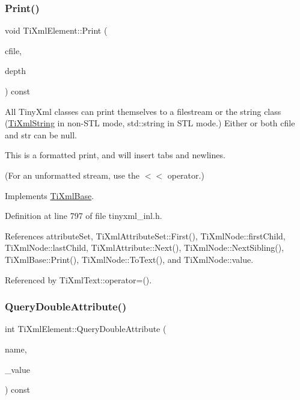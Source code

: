 \hypertarget{class_ti_xml_element_aa31a15cddfb8601a31236fe7d2569fb4}{}\label{class_ti_xml_element_aa31a15cddfb8601a31236fe7d2569fb4} 
\subsubsection{\texorpdfstring{Print()}{Print()}}
{\footnotesize\ttfamily void Ti\+Xml\+Element\+::\+Print (\begin{DoxyParamCaption}\item[{F\+I\+LE $\ast$}]{cfile,  }\item[{int}]{depth }\end{DoxyParamCaption}) const\hspace{0.3cm}{\ttfamily [virtual]}}

All Tiny\+Xml classes can print themselves to a filestream or the string class (\hyperlink{class_ti_xml_string}{Ti\+Xml\+String} in non-\/\+S\+TL mode, std\+::string in S\+TL mode.) Either or both cfile and str can be null.

This is a formatted print, and will insert tabs and newlines.

(For an unformatted stream, use the $<$$<$ operator.) 

Implements \hyperlink{class_ti_xml_base_a0de56b3f2ef14c65091a3b916437b512}{Ti\+Xml\+Base}.



Definition at line 797 of file tinyxml\+\_\+inl.\+h.



References attribute\+Set, Ti\+Xml\+Attribute\+Set\+::\+First(), Ti\+Xml\+Node\+::first\+Child, Ti\+Xml\+Node\+::last\+Child, Ti\+Xml\+Attribute\+::\+Next(), Ti\+Xml\+Node\+::\+Next\+Sibling(), Ti\+Xml\+Base\+::\+Print(), Ti\+Xml\+Node\+::\+To\+Text(), and Ti\+Xml\+Node\+::value.



Referenced by Ti\+Xml\+Text\+::operator=().

\hypertarget{class_ti_xml_element_ae04bad29ddb281a7e6c662b3882e9928}{}\label{class_ti_xml_element_ae04bad29ddb281a7e6c662b3882e9928} 
\subsubsection{\texorpdfstring{Query\+Double\+Attribute()}{QueryDoubleAttribute()}\hspace{0.1cm}{\footnotesize\ttfamily [1/2]}}
{\footnotesize\ttfamily int Ti\+Xml\+Element\+::\+Query\+Double\+Attribute (\begin{DoxyParamCaption}\item[{const char $\ast$}]{name,  }\item[{double $\ast$}]{\+\_\+value }\end{DoxyParamCaption}) const}



